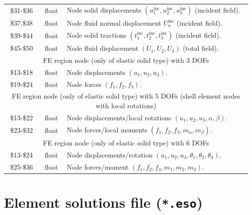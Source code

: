 \documentclass[a4paper,fleqn]{book}
\begin{document}
\begin{longtable}{ccp{11cm}}
\$31-\$36 & float & Node solid displacements $(u_1^\mathrm{inc},u_2^\mathrm{inc},u_3^\mathrm{inc})$ (incident field). \\
\$37,\$38 & float & Node fluid normal displacement $U_n^\mathrm{inc}$ (incident field). \\
\$39-\$44 & float & Node solid tractions $(t_1^\mathrm{inc},t_2^\mathrm{inc},t_3^\mathrm{inc})$ (incident field). \\
\$45-\$50 & float & Node fluid displacement $(U_1,U_2,U_3)$ (total field). \\
\midrule
\multicolumn{3}{c}{FE region node (only of elastic solid type) with 3 DOFs} \\
\$13-\$18 & float & Node displacements $(u_1,u_2,u_3)$. \\
\$19-\$24 & float & Node forces $(f_1,f_2,f_3)$. \\
\midrule
\multicolumn{3}{c}{FE region node (only of elastic solid type) with 5 DOFs (shell element nodes with local rotations)}
\\
\$13-\$22 & float & Node displacements/local rotations $(u_1,u_2,u_3,\alpha,\beta)$. \\
\$23-\$32 & float & Node forces/local moments $(f_1,f_2,f_3,m_\alpha,m_\beta)$. \\
\midrule
\multicolumn{3}{c}{FE region node (only of elastic solid type) with 6 DOFs} \\
\$13-\$24 & float & Node displacements/rotation $(u_1,u_2,u_3,\theta_1,\theta_2,\theta_3)$. \\
\$25-\$36 & float & Node forces/moment $(f_1,f_2,f_3,m_1,m_2,m_3)$. \\
\end{longtable}

\section{Element solutions file (\texttt{*.eso})}
\end{document}
